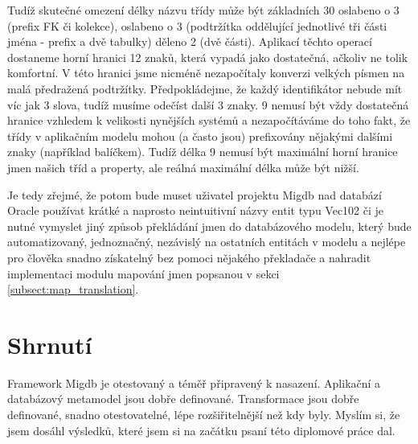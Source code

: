 \documentclass[11pt,twoside,a4paper]{book}
\begin{document}
Tudíž skutečné omezení délky názvu třídy může být základních 30 oslabeno o 3
(prefix FK či kolekce), oslabeno o 3 (podtržítka oddělující jednotlivé tři
části jména - prefix a dvě tabulky) děleno 2 (dvě části). Aplikací těchto
operací dostaneme horní hranici 12 znaků, která vypadá jako dostatečná, ačkoliv 
ne tolik komfortní. V této hranici jsme nicméně nezapočítaly konverzi velkých
písmen na malá předražená podtržítky. Předpokládejme, že každý identifikátor
nebude mít víc jak 3 slova, tudíž musíme odečíst další 3 znaky. 9 nemusí být
vždy dostatečná hranice vzhledem k velikosti nynějších systémů a nezapočítáváme
do toho fakt, že třídy v aplikačním modelu mohou (a často jsou) prefixovány
nějakými dalšími znaky (například balíčkem). Tudíž délka 9 nemusí
být maximální horní hranice jmen našich tříd a property, ale reálná
maximální délka může být nižší. 

Je tedy zřejmé, že potom bude muset uživatel projektu Migdb nad databází Oracle
používat krátké a naprosto neintuitivní názvy entit typu Vec102 či je nutné
vymyslet jiný způsob překládání jmen do databázového modelu, který bude
automatizovaný, jednoznačný, nezávislý na ostatních entitách v modelu a nejlépe
pro člověka snadno získatelný bez pomoci nějakého překladače a nahradit
implementaci modulu mapování jmen popsanou v sekci
\ref{subsect:map_translation}.


\section{Shrnutí}
Framework Migdb je otestovaný a téměř připravený k nasazení.
Aplikační a databázový metamodel jsou dobře definované. Transformace jsou dobře
definované, snadno otestovatelné, lépe rozšiřitelnější než kdy byly. Myslím si,
že jsem dosáhl výsledků, které jsem si na začátku psaní této diplomové práce dal. 

\end{document}
